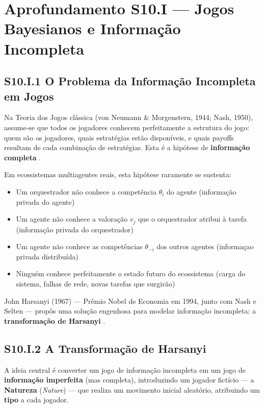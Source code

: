 \section*{Aprofundamento S10.I --- Jogos Bayesianos e Informação Incompleta}

\subsection*{S10.I.1 O Problema da Informação Incompleta em Jogos}

Na Teoria dos Jogos clássica (von Neumann \& Morgenstern, 1944; Nash, 1950), assume-se que todos os jogadores conhecem perfeitamente a estrutura do jogo: quem são os jogadores, quais estratégias estão disponíveis, e quais payoffs resultam de cada combinação de estratégias. Esta é a hipótese de \textbf{informação completa} \cite{vonneumann1944, nash1950equilibrium}.

Em ecossistemas multiagentes reais, esta hipótese raramente se sustenta:

\begin{itemize}
    \item Um orquestrador não conhece a competência $\theta_i$ do agente (informação privada do agente)
    \item Um agente não conhece a valoração $v_j$ que o orquestrador atribui à tarefa (informação privada do orquestrador)
    \item Um agente não conhece as competências $\theta_{-i}$ dos outros agentes (informaçao privada distribuída)
    \item Ninguém conhece perfeitamente o estado futuro do ecossistema (carga do sistema, falhas de rede, novas tarefas que surgirão)
\end{itemize}

John Harsanyi (1967) --- Prêmio Nobel de Economia em 1994, junto com Nash e Selten --- propôs uma solução engenhosa para modelar informação incompleta: a \textbf{transformação de Harsanyi} \cite{harsanyi1967games}.

\subsection*{S10.I.2 A Transformação de Harsanyi}

A ideia central é converter um jogo de informação incompleta em um jogo de \textbf{informação imperfeita} (mas completa), introduzindo um jogador fictício --- a \textbf{Natureza} (\textit{Nature}) --- que realiza um movimento inicial aleatório, atribuindo um \textbf{tipo} a cada jogador.

